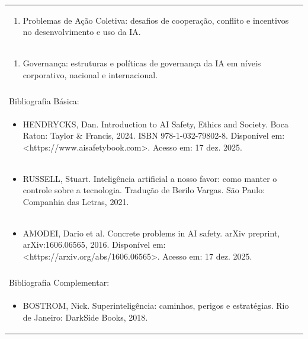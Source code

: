 \documentclass[11pt]{article}
\begin{document}
\begin{center}
\begin{longtable}{|p{4cm}|p{4cm}|p{4cm}|p{4cm}|}
\multicolumn{4}{|p{\dimexpr 16cm + 6\tabcolsep\relax}|}{\begin{enumerate}[start=7]\item Problemas de Ação Coletiva: desafios de cooperação, conflito e incentivos no desenvolvimento e uso da IA.\end{enumerate}}\\
\multicolumn{4}{|p{\dimexpr 16cm + 6\tabcolsep\relax}|}{\begin{enumerate}[start=8]\item Governança: estruturas e políticas de governança da IA em níveis corporativo, nacional e internacional.\end{enumerate}}\\
\multicolumn{4}{|p{\dimexpr 16cm + 6\tabcolsep\relax}|}{}\\
\hline
\multicolumn{4}{|p{16cm}|}{Bibliografia Básica:}\\*
\multicolumn{4}{|p{\dimexpr 16cm + 6\tabcolsep\relax}|}{\begin{itemize}\item HENDRYCKS, Dan. Introduction to AI Safety, Ethics and Society. Boca Raton: Taylor \& Francis, 2024. ISBN 978-1-032-79802-8. Disponível em: <https://www.aisafetybook.com>. Acesso em: 17 dez. 2025.\end{itemize}}\\
\multicolumn{4}{|p{\dimexpr 16cm + 6\tabcolsep\relax}|}{\begin{itemize}\item RUSSELL, Stuart. Inteligência artificial a nosso favor: como manter o controle sobre a tecnologia. Tradução de Berilo Vargas. São Paulo: Companhia das Letras, 2021.\end{itemize}}\\
\multicolumn{4}{|p{\dimexpr 16cm + 6\tabcolsep\relax}|}{\begin{itemize}\item AMODEI, Dario et al. Concrete problems in AI safety. arXiv preprint, arXiv:1606.06565, 2016. Disponível em: <https://arxiv.org/abs/1606.06565>. Acesso em: 17 dez. 2025.\end{itemize}}\\
\multicolumn{4}{|p{16cm}|}{}\\
\hline
\multicolumn{4}{|p{16cm}|}{Bibliografia Complementar:}\\*
\multicolumn{4}{|p{\dimexpr 16cm + 6\tabcolsep\relax}|}{\begin{itemize}\item BOSTROM, Nick. Superinteligência: caminhos, perigos e estratégias. Rio de Janeiro: DarkSide Books, 2018.\end{itemize}}\\

\end{longtable}
\end{center}
\end{document}
